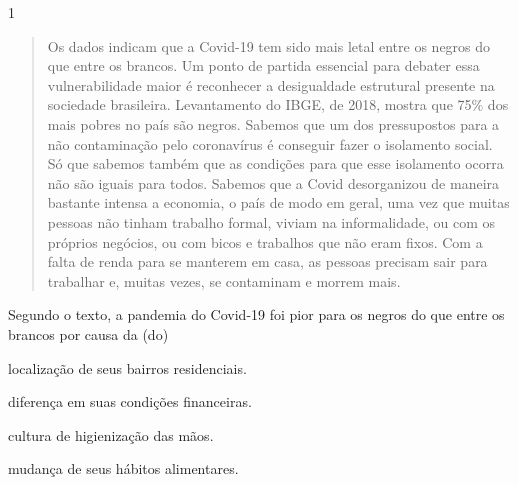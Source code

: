 
\num{1}

\begin{quote}
Os dados indicam que a Covid-19 tem sido mais letal entre os negros
do que entre os brancos. Um ponto de partida essencial para debater essa
vulnerabilidade maior é reconhecer a desigualdade estrutural presente na
sociedade brasileira. Levantamento do IBGE, de 2018, mostra que 75\% dos
mais pobres no país são negros. Sabemos que um dos pressupostos para a
não contaminação pelo coronavírus é conseguir fazer o isolamento social.
Só que sabemos também que as condições para que esse isolamento ocorra
não são iguais para todos. Sabemos que a Covid desorganizou de maneira
bastante intensa a economia, o país de modo em geral, uma vez que muitas
pessoas não tinham trabalho formal, viviam na informalidade, ou com os
próprios negócios, ou com bicos e trabalhos que não eram fixos. Com a
falta de renda para se manterem em casa, as pessoas precisam sair para
trabalhar e, muitas vezes, se contaminam e morrem mais.

\end{quote}

Segundo o texto, a pandemia do Covid-19 foi pior para os negros do que
entre os brancos por causa da (do)

\begin{escolha}
\item localização de seus bairros residenciais.

\item diferença em suas condições financeiras.

\item cultura de higienização das mãos.

\item mudança de seus hábitos alimentares.
\end{escolha}


